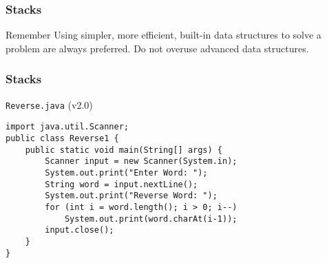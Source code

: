 \documentclass[10pt, compress]{beamer}
\begin{document}
\begin{frame}[fragile]
	\frametitle{Stacks}
	\begin{block}{Remember}
		Using simpler, more efficient, built-in data structures to solve a problem are always preferred. Do not overuse advanced data structures.
	\end{block}
\end{frame}

\begin{frame}[fragile]
	\frametitle{Stacks}
	\begin{block}{\texttt{Reverse.java} (v2.0)}
		\begin{verbatim}
import java.util.Scanner;
public class Reverse1 {
	public static void main(String[] args) {
		Scanner input = new Scanner(System.in);
		System.out.print("Enter Word: ");
		String word = input.nextLine();
		System.out.print("Reverse Word: ");
		for (int i = word.length(); i > 0; i--)
			System.out.print(word.charAt(i-1));
		input.close();
	}
}
		\end{verbatim}
	\end{block}
\end{frame}

\end{document}
